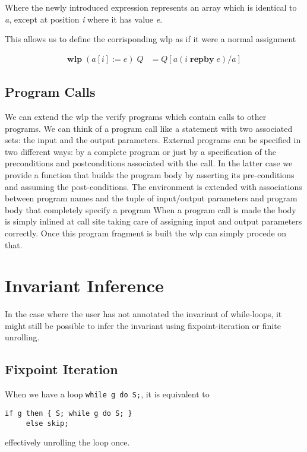 \documentclass[]{scrartcl}
\newcommand{\WLP}[2]{\ensuremath{\mathbf{wlp}\;#1\;#2}}
\newcommand{\REPBY}[2]{\ensuremath{#1\;\mathbf{repby}\;#2}}
\begin{document}
Where the newly introduced expression represents an array which is identical to
\emph{a}, except at position \emph{i} where it has value \emph{e}.

This allows us to define the corrisponding wlp as if it were a normal assignment

\begin{align}
  \WLP{(a[i] := e)}{Q} &= Q[a( \REPBY{i}{e} ) / a]
\end{align}

\subsection{Program Calls}
We can extend the wlp the verify programs which contain calls to other programs.
We can think of a program call like a statement with two associated sets:
the input and the output parameters.
External programs can be specified in two different ways: by a complete program or
just by a specification of the preconditions and postconditions associated with
the call.
In the latter case we provide a function that builds the program body by asserting
its pre-conditions and assuming the post-conditions.
The environment is extended with associations between program names and the
tuple of input/output parameters and program body that completely specify a program
When a program call is made the body is simply inlined at call site taking care
of assigning input and output parameters correctly. Once this program fragment is
built the wlp can simply procede on that.
\section{Invariant Inference}

In the case where the user has not annotated the invariant of while-loops,
it might still be possible to infer the invariant using fixpoint-iteration
or finite unrolling.

\subsection{Fixpoint Iteration}

When we have a loop \lstinline|while g do S;|, it is equivalent to
\begin{lstlisting}
if g then { S; while g do S; }
     else skip;
\end{lstlisting}
effectively unrolling the loop once.
\end{document}
